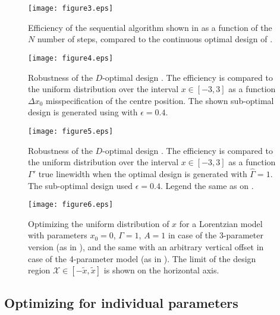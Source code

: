 \documentclass[12pt]{iopart}
\begin{document}
\begin{figure}
\texttt{[image: figure3.eps]}
\caption{Efficiency of the sequential algorithm shown in  as a function of the $N$ number of steps, compared to the continuous optimal design of .}
\label{fig:xinefficiency}
\end{figure}

\begin{figure}
\texttt{[image: figure4.eps]}
\caption{Robustness of the $D$-optimal design . The efficiency is compared to the uniform distribution over the interval $x\in [-3,3]$ as a function $\Delta x_0$ misspecification of the centre position. The shown sub-optimal design is generated using  with $\epsilon = 0.4$.}
\label{fig:x0robust}
\end{figure}

\begin{figure}
\texttt{[image: figure5.eps]}
\caption{Robustness of the $D$-optimal design . The efficiency is compared to the uniform distribution over the interval $x\in [-3,3]$ as a function $\Gamma'$ true linewidth when the optimal design is generated with $\hat \Gamma = 1$. The sub-optimal design used $\epsilon = 0.4$. Legend the same as on .}
\label{fig:grobust}
\end{figure}

\begin{figure}
\texttt{[image: figure6.eps]}
\caption{Optimizing the uniform distribution of $x$ for a Lorentzian model with parameters $x_0=0$, $\Gamma = 1$, $A = 1$ in case of the 3-parameter version (as in ), and the same with an arbitrary vertical offset in case of the 4-parameter model (as in ). The limit of the design region $\mathcal{X} \in [-\tilde x, \tilde x]$ is shown on the horizontal axis.}
\label{fig:optimaluniform}
\end{figure}


\subsection{Optimizing for individual parameters}
\label{seq:exopts}
\end{document}
